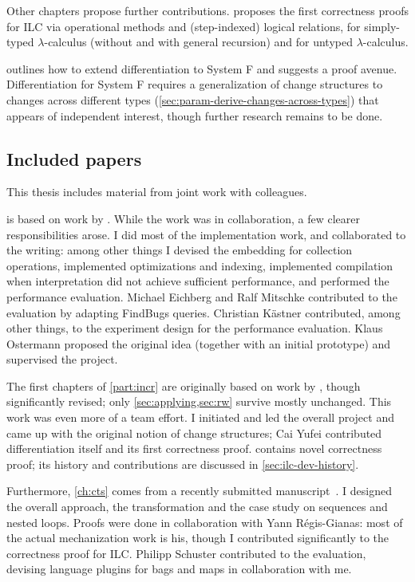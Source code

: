 
Other chapters propose further contributions.
 proposes the first correctness proofs for ILC via operational
methods and (step-indexed) logical relations, for simply-typed $\lambda$-calculus
(without and with general recursion) and for untyped $\lambda$-calculus.

 outlines how to extend differentiation to
System F and suggests a proof avenue. Differentiation for System F requires a
generalization of change structures to changes across different types
(\cref{sec:param-derive-changes-across-types}) that appears of independent
interest, though further research remains to be done.

\subsection{Included papers}
This thesis includes material from joint work with colleagues.

 is based on work by \citet*{GiarrussoAOSD13}. While the
work was in collaboration, a few clearer responsibilities arose.
I did most of the implementation work, and collaborated to the writing: among
other things I devised the embedding for collection operations, implemented
optimizations and indexing, implemented compilation when interpretation did not
achieve sufficient performance, and performed the performance evaluation.
Michael Eichberg and Ralf Mitschke contributed to the evaluation by adapting
FindBugs queries.
Christian K{\"{a}}stner contributed, among other things, to the experiment
design for the performance evaluation. Klaus Ostermann proposed the original
idea (together with an initial prototype) and supervised the project.

The first chapters of \cref{part:incr} are originally based on work by \citet*{CaiEtAl2014ILC}, though
significantly revised; only \cref{sec:applying,sec:rw} survive mostly unchanged.
This work was even more of a team effort. I initiated and led the
overall project and came up with the original notion of change structures; Cai
Yufei contributed differentiation itself and its first correctness proof.
 contains novel correctness proof; its history and
contributions are discussed in \cref{sec:ilc-dev-history}.

Furthermore, \cref{ch:cts} comes from a recently submitted
manuscript~\citep*{Giarrusso2018Static}. I
designed the overall approach, the transformation and the case study on
sequences and nested loops. Proofs were done in collaboration with Yann
Régis-Gianas: most of the actual mechanization work is his, though I contributed significantly to the
correctness proof for ILC. Philipp Schuster contributed to the evaluation,
devising language plugins for bags and maps in collaboration with me.

